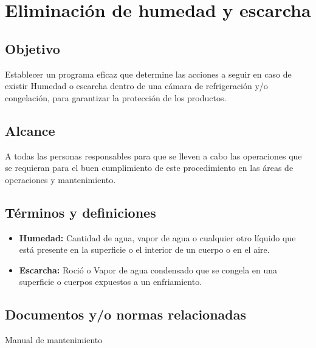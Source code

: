 \thispagestyle{formato-PI}
\renewcommand{\MayorVer}{2}
\renewcommand{\MenorVer}{0}
\renewcommand{\FechaPub}{2023--01}
\renewcommand{\TipoID}{PRO}
\renewcommand{\Titulo}{Eliminación de humedad y escarcha}

\section{\Titulo}
\renewcommand{\Codigo}{\Prog--\thesection--\TipoID}

\subsection{Objetivo}

Establecer un programa eficaz que determine las acciones a seguir en caso de existir Humedad o escarcha dentro de una cámara de refrigeración y/o congelación, para garantizar la protección de los productos.

\subsection{Alcance}

A todas las personas responsables para que se lleven a cabo las operaciones que se requieran para el buen cumplimiento de este procedimiento en las áreas de operaciones y mantenimiento.

\subsection{Términos y definiciones}

\begin{itemize}
	\item \textbf{Humedad:} Cantidad de agua, vapor de agua o cualquier otro líquido que está presente en la superficie o el interior de un cuerpo o en el aire.
	\item \textbf{Escarcha:} Roció o Vapor de agua condensado que se congela en una superficie o cuerpos expuestos a un enfriamiento.
\end{itemize}

\subsection{Documentos y/o normas relacionadas}

Manual de mantenimiento %

